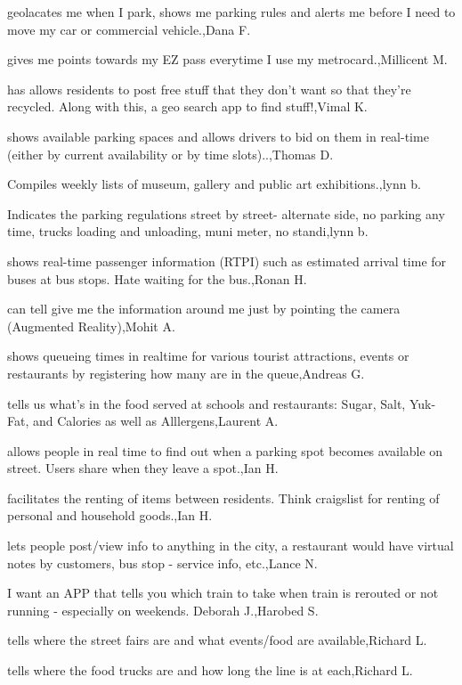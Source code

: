 \documentclass{article}
\begin{document}
geolacates me when I park, shows me parking rules and alerts me before I need to move my car or commercial vehicle.,Dana F.

gives me points towards my EZ pass everytime I use my metrocard.,Millicent M.

has allows residents to post free stuff that they don't want so that they're recycled.  Along with this, a geo search app to find stuff!,Vimal K.

shows available parking spaces and allows drivers to bid on them in real-time (either by current availability or by time slots)..,Thomas D.

Compiles weekly  lists of museum, gallery and public art exhibitions.,lynn b.

Indicates the parking regulations street by street- alternate side, no parking any time, trucks loading and unloading, muni meter, no standi,lynn b.

shows real-time passenger information (RTPI) such as estimated arrival time for buses at bus stops.  Hate waiting for the bus.,Ronan H.

can tell give me the information around me just by pointing the camera (Augmented Reality),Mohit A.

shows queueing times in realtime for various tourist attractions, events or restaurants by registering how many are in the queue,Andreas G.

tells us what's in the food served at schools and restaurants: Sugar, Salt, Yuk-Fat, and Calories as well as Alllergens,Laurent A.

allows people in real time to find out when a parking spot becomes available on street. Users share when they leave a spot.,Ian H.

facilitates the renting of items between residents. Think  craigslist for renting of personal and household goods.,Ian H.

lets people post/view info to anything in the city, a restaurant would have virtual notes by customers, bus stop - service info, etc.,Lance N.

I want an APP that tells you which train to take when train is rerouted or not running - especially on weekends. Deborah J.,Harobed S.

tells where the street fairs are and what events/food are available,Richard L.

tells where the food trucks are and how long the line is at each,Richard L.
\end{document}
